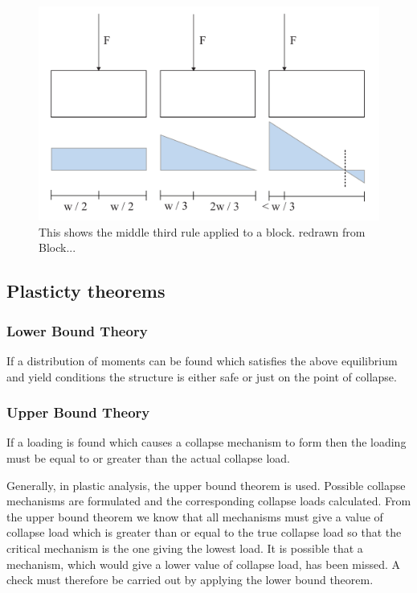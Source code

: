 \begin{figure}[H]
\centering
\includegraphics[width=0.9\linewidth ]{figure/Theory/Safety.pdf}
\caption{This shows the middle third rule applied to a block. redrawn from Block...}
\end{figure}


\subsection{Plasticty theorems}
\subsubsection{Lower Bound Theory}


If a distribution of moments can be found which satisfies the above equilibrium and yield conditions the structure is either safe or just on the point of collapse.
\subsubsection{Upper Bound Theory}


If a loading is found which causes a collapse mechanism to form then the loading must be equal to or greater than the actual collapse load.

Generally, in plastic analysis, the upper bound theorem is used. Possible collapse mechanisms are formulated and the corresponding collapse loads calculated. From the upper bound theorem we know that all mechanisms must give a value of collapse load which is greater than or equal to the true collapse load so that the critical mechanism is the one giving the lowest load. It is possible that a mechanism, which would give a lower value of collapse load, has been missed. A check must therefore be carried out by applying the lower bound theorem.


